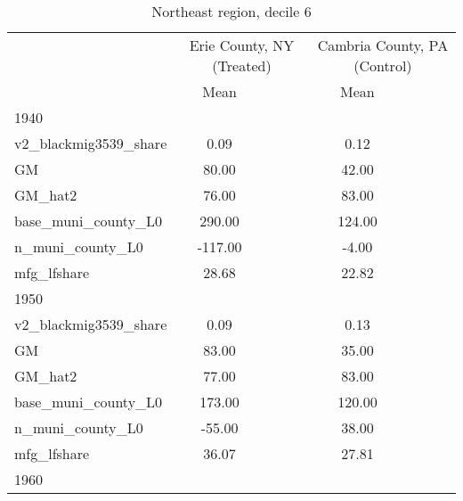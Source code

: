 \begin{table}[htbp]\centering
\def\sym#1{\ifmmode^{#1}\else\(^{#1}\)\fi}
\caption{Northeast region, decile 6 \label{tab1}}
\begin{tabular}{l*{2}{ccc}}
\toprule
                    &\multicolumn{3}{c}{Erie County, NY (Treated)}&\multicolumn{3}{c}{Cambria County, PA (Control)}\\
                    &        Mean&            &            &        Mean&            &            \\
\midrule
1940                &            &            &            &            &            &            \\
v2\_blackmig3539\_share&        0.09&            &            &        0.12&            &            \\
GM                  &       80.00&            &            &       42.00&            &            \\
GM\_hat2             &       76.00&            &            &       83.00&            &            \\
base\_muni\_county\_L0 &      290.00&            &            &      124.00&            &            \\
n\_muni\_county\_L0    &     -117.00&            &            &       -4.00&            &            \\
mfg\_lfshare         &       28.68&            &            &       22.82&            &            \\
\midrule
1950                &            &            &            &            &            &            \\
v2\_blackmig3539\_share&        0.09&            &            &        0.13&            &            \\
GM                  &       83.00&            &            &       35.00&            &            \\
GM\_hat2             &       77.00&            &            &       83.00&            &            \\
base\_muni\_county\_L0 &      173.00&            &            &      120.00&            &            \\
n\_muni\_county\_L0    &      -55.00&            &            &       38.00&            &            \\
mfg\_lfshare         &       36.07&            &            &       27.81&            &            \\
\midrule
1960                &            &            &            &            &            &            \\

\end{tabular}
\end{table}
